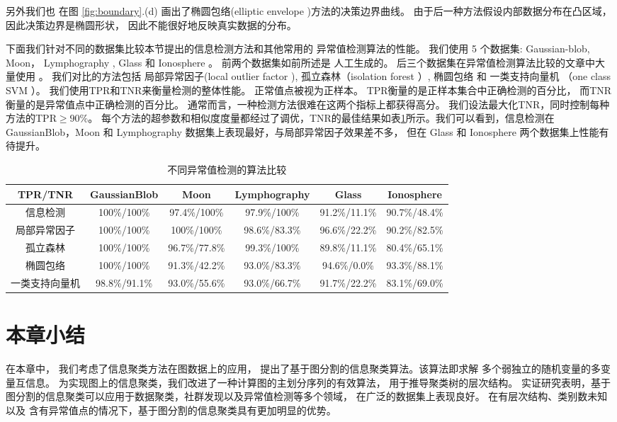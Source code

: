 另外我们也
在图 \ref{fig:boundary}.(d) 画出了椭圆包络(elliptic envelope \citep{rousseeuw1999fast} )方法的决策边界曲线。
由于后一种方法假设内部数据分布在凸区域，因此决策边界是椭圆形状，
因此不能很好地反映真实数据的分布。

下面我们针对不同的数据集比较本节提出的信息检测方法和其他常用的
异常值检测算法的性能。
我们使用 5 个数据集: Gaussian-blob, Moon， Lymphography
\cite{lazarevic2005feature}, Glass 和 Ionosphere \cite{keller2012hics}。 
前两个数据集如前所述是
人工生成的。
后三个数据集在异常值检测算法比较的文章中大量使用
\cite{campos2016evaluation}。
我们对比的方法包括
局部异常因子(local outlier factor \citep{Breunig}), 孤立森林（isolation forest \citep{if}）, 
椭圆包络  和
一类支持向量机 （one class SVM \citep{svm}）。 
我们使用TPR和TNR来衡量检测的整体性能。
正常值点被视为正样本。
TPR衡量的是正样本集合中正确检测的百分比，
而TNR衡量的是异常值点中正确检测的百分比。
通常而言，一种检测方法很难在这两个指标上都获得高分。
我们设法最大化TNR，同时控制每种方法的TPR$\geq 90\%$。
每个方法的超参数和相似度度量都经过了调优，TNR的最佳结果如表\ref{tab:odm}所示。我们可以看到，信息检测在 GaussianBlob，Moon 和
Lymphography 数据集上表现最好，与局部异常因子效果差不多，
但在 Glass 和  Ionosphere 两个数据集上性能有待提升。
\begin{table}
  \begin{adjustbox}{width=\columnwidth,center}
\begin{tabular}{cccccc}
  \hline
         TPR/TNR        &  GaussianBlob   &      Moon       &  Lymphography  &     Glass     &  Ionosphere   \\
  \hline
      信息检测    & 100\%/100\% & 97.4\%/100\%  & 97.9\%/100\% & 91.2\%/11.1\% & 90.7\%/48.4\% \\
      局部异常因子 & 100\%/100\% & 100\%/100\% & 98.6\%/83.3\%  & 96.6\%/22.2\% & 90.2\%/82.5\% \\
   孤立森林   & 100\%/100\% &  96.7\%/77.8\%  & 99.3\%/100\% & 89.8\%/11.1\% & 80.4\%/65.1\% \\
    椭圆包络   & 100\%/100\% &  91.3\%/42.2\%  & 93.0\%/83.3\%  & 94.6\%/0.0\%  & 93.3\%/88.1\% \\
     一类支持向量机     &  98.8\%/91.1\%  &  93.0\%/55.6\%  & 93.0\%/66.7\%  & 91.7\%/22.2\% & 83.1\%/69.0\% \\
  \hline
  \end{tabular}
\end{adjustbox}
\caption{不同异常值检测的算法比较}\label{tab:odm}
\end{table}

\section{本章小结}
在本章中，
我们考虑了信息聚类方法在图数据上的应用，
提出了基于图分割的信息聚类算法。该算法即求解
多个弱独立的随机变量的多变量互信息。
为实现图上的信息聚类，我们改进了一种计算图的主划分序列的有效算法，
用于推导聚类树的层次结构。
实证研究表明，基于图分割的信息聚类可以应用于数据聚类，社群发现以及异常值检测等多个领域，
在广泛的数据集上表现良好。
在有层次结构、类别数未知以及
含有异常值点的情况下，基于图分割的信息聚类具有更加明显的优势。
